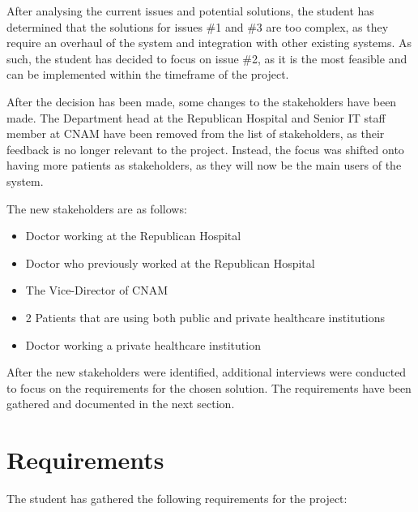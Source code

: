 After analysing the current issues and potential solutions, the student has determined that the solutions for issues \#1 and \#3 are too complex, as they require an overhaul of the system and integration with other existing systems. As such, the student has decided to focus on issue \#2, as it is the most feasible and can be implemented within the timeframe of the project. 

After the decision has been made, some changes to the stakeholders have been made. The Department head at the Republican Hospital and Senior IT staff member at CNAM have been removed from the list of stakeholders, as their feedback is no longer relevant to the project. Instead, the focus was shifted onto having more patients as stakeholders, as they will now be the main users of the system. 

The new stakeholders are as follows:
\begin{itemize}
    \item Doctor working at the Republican Hospital
    \item Doctor who previously worked at the Republican Hospital
    \item The Vice-Director of CNAM
    \item 2 Patients that are using both public and private healthcare institutions
    \item Doctor working a private healthcare institution
\end{itemize}

After the new stakeholders were identified, additional interviews were conducted to focus on the requirements for the chosen solution. The requirements have been gathered and documented in the next section.

\section{Requirements}

The student has gathered the following requirements for the project:

